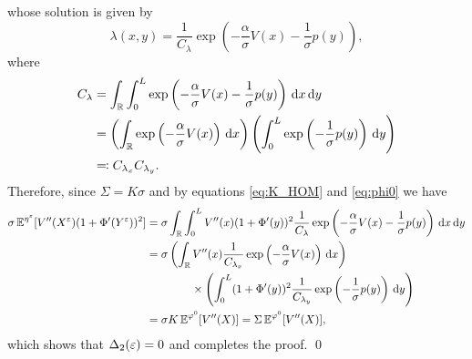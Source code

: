 \documentclass[10pt]{article}
\begin{document}
\begin{appendices}
\begin{equation}
	\end{equation}
	whose solution is given by
	\begin{equation}
	\lambda(x,y) = \frac{1}{C_\lambda} \exp \left( - \frac\alpha\sigma V(x) - \frac1\sigma p(y) \right),
	\end{equation}
	where
	\begin{equation}
	\begin{aligned}
	C_{\lambda} &= \int_{\mathbb{R}} \int_0^L \exp \left( - \frac\alpha\sigma V(x) - \frac1\sigma p(y) \right) \,\mathrm{d} x \,\mathrm{d} y \\
	&= \left( \int_{\mathbb{R}} \exp \left( - \frac\alpha\sigma V(x) \right) \,\mathrm{d} x \right) \left( \int_0^L \exp \left( - \frac1\sigma p(y) \right) \,\mathrm{d} y \right) \\
	&\eqqcolon C_{\lambda_x} C_{\lambda_y}.
	\end{aligned}
	\end{equation}
	Therefore, since $\Sigma = K\sigma$ and by equations \eqref{eq:K_HOM} and \eqref{eq:phi0} we have
	\begin{equation}
	\begin{aligned}
	\sigma \operatorname{\mathbb{E}}^{\eta^\varepsilon} [V''(X^\varepsilon) (1 + \Phi'(Y^\varepsilon))^2] &= \sigma \int_{\mathbb{R}} \int_0^L V''(x) (1 + \Phi'(y))^2 \frac{1}{C_\lambda} \exp \left( - \frac\alpha\sigma V(x) - \frac1\sigma p(y) \right) \,\mathrm{d} x \,\mathrm{d} y \\
	&= \sigma \left( \int_{\mathbb{R}} V''(x) \frac{1}{C_{\lambda_x}} \exp \left( - \frac\alpha\sigma V(x) \right) \,\mathrm{d} x \right) \\
	&\qquad \qquad \times \left( \int_0^L (1+\Phi'(y))^2 \frac{1}{C_{\lambda_y}} \exp \left( - \frac1\sigma p(y) \right) \,\mathrm{d} y \right) \\
	&= \sigma K \operatorname{\mathbb{E}}^{\varphi^0}[V''(X)] = \Sigma \operatorname{\mathbb{E}}^{\varphi^0}[V''(X)],
	\end{aligned}
	\end{equation}
	which shows that $\Delta_2(\varepsilon) = 0$ and completes the proof. \qed 


\end{appendices}
\end{document}
